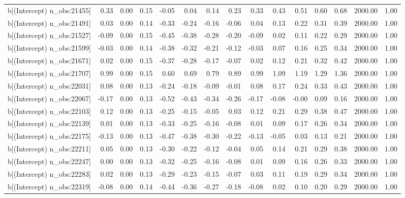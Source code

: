 \begin{table}[ht]
\begin{tabular}{rrrrrrrrrrrrrrr}
  b[(Intercept) n\_obs:21455] & 0.33 & 0.00 & 0.15 & -0.05 & 0.04 & 0.14 & 0.23 & 0.33 & 0.43 & 0.51 & 0.60 & 0.68 & 2000.00 & 1.00 \\ 
  b[(Intercept) n\_obs:21491] & 0.03 & 0.00 & 0.14 & -0.33 & -0.24 & -0.16 & -0.06 & 0.04 & 0.13 & 0.22 & 0.31 & 0.39 & 2000.00 & 1.00 \\ 
  b[(Intercept) n\_obs:21527] & -0.09 & 0.00 & 0.15 & -0.45 & -0.38 & -0.28 & -0.20 & -0.09 & 0.02 & 0.11 & 0.22 & 0.29 & 2000.00 & 1.00 \\ 
  b[(Intercept) n\_obs:21599] & -0.03 & 0.00 & 0.14 & -0.38 & -0.32 & -0.21 & -0.12 & -0.03 & 0.07 & 0.16 & 0.25 & 0.34 & 2000.00 & 1.00 \\ 
  b[(Intercept) n\_obs:21671] & 0.02 & 0.00 & 0.15 & -0.37 & -0.28 & -0.17 & -0.07 & 0.02 & 0.12 & 0.21 & 0.32 & 0.42 & 2000.00 & 1.00 \\ 
  b[(Intercept) n\_obs:21707] & 0.99 & 0.00 & 0.15 & 0.60 & 0.69 & 0.79 & 0.89 & 0.99 & 1.09 & 1.19 & 1.29 & 1.36 & 2000.00 & 1.00 \\ 
  b[(Intercept) n\_obs:22031] & 0.08 & 0.00 & 0.13 & -0.24 & -0.18 & -0.09 & -0.01 & 0.08 & 0.17 & 0.24 & 0.33 & 0.43 & 2000.00 & 1.00 \\ 
  b[(Intercept) n\_obs:22067] & -0.17 & 0.00 & 0.13 & -0.52 & -0.43 & -0.34 & -0.26 & -0.17 & -0.08 & -0.00 & 0.09 & 0.16 & 2000.00 & 1.00 \\ 
  b[(Intercept) n\_obs:22103] & 0.12 & 0.00 & 0.13 & -0.25 & -0.15 & -0.05 & 0.03 & 0.12 & 0.21 & 0.29 & 0.38 & 0.47 & 2000.00 & 1.00 \\ 
  b[(Intercept) n\_obs:22139] & 0.01 & 0.00 & 0.13 & -0.33 & -0.25 & -0.16 & -0.08 & 0.01 & 0.09 & 0.17 & 0.26 & 0.34 & 2000.00 & 1.00 \\ 
  b[(Intercept) n\_obs:22175] & -0.13 & 0.00 & 0.13 & -0.47 & -0.38 & -0.30 & -0.22 & -0.13 & -0.05 & 0.03 & 0.13 & 0.21 & 2000.00 & 1.00 \\ 
  b[(Intercept) n\_obs:22211] & 0.05 & 0.00 & 0.13 & -0.30 & -0.22 & -0.12 & -0.04 & 0.05 & 0.14 & 0.21 & 0.29 & 0.38 & 2000.00 & 1.00 \\ 
  b[(Intercept) n\_obs:22247] & 0.00 & 0.00 & 0.13 & -0.32 & -0.25 & -0.16 & -0.08 & 0.01 & 0.09 & 0.16 & 0.26 & 0.33 & 2000.00 & 1.00 \\ 
  b[(Intercept) n\_obs:22283] & 0.02 & 0.00 & 0.13 & -0.29 & -0.23 & -0.15 & -0.07 & 0.03 & 0.11 & 0.19 & 0.29 & 0.34 & 2000.00 & 1.00 \\ 
  b[(Intercept) n\_obs:22319] & -0.08 & 0.00 & 0.14 & -0.44 & -0.36 & -0.27 & -0.18 & -0.08 & 0.02 & 0.10 & 0.20 & 0.29 & 2000.00 & 1.00 \\ 

\end{tabular}
\end{table}
